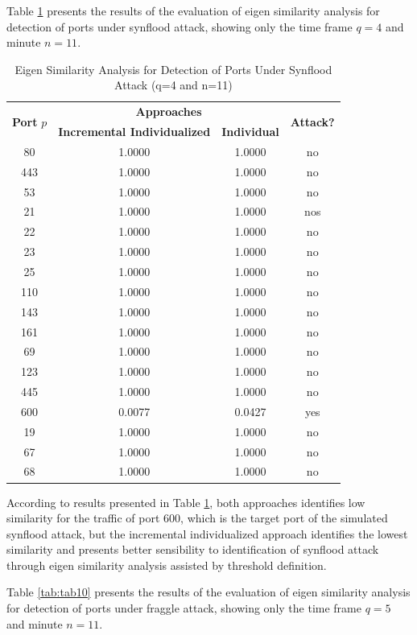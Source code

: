 Table \ref{tab:tab9} presents the results of the evaluation of eigen similarity analysis for detection of ports under synflood attack, showing only the time frame $q=4$ and minute $n=11$.

\begin{table}[h!]
  \centering
  \caption{Eigen Similarity Analysis for Detection of Ports Under Synflood Attack (q=4 and n=11)}
  \label{tab:tab9}
  \begin{tabular}{ c c c c }
	\toprule
	\multirow{2}{*}{\textbf{Port} $p$}   &\multicolumn{2}{c}{\textbf{Approaches}} &\multirow{2}{*}{\textbf{Attack?}}\\ 
			\hhline{~--~}
			&\textbf{Incremental Individualized} &\textbf{Individual}\\
	\midrule
	80 &1.0000 &1.0000 &no \\
	443 &1.0000 &1.0000 &no \\
	53 &1.0000 &1.0000 &no \\
	21 &1.0000 &1.0000 &nos \\
	22 &1.0000 &1.0000 &no \\
	23 &1.0000 &1.0000 &no \\
	25 &1.0000 &1.0000 &no \\
	110 &1.0000 &1.0000 &no \\
	143 &1.0000 &1.0000 &no \\
	161 &1.0000 &1.0000 &no \\
	69 &1.0000 &1.0000 &no \\
	123 &1.0000 &1.0000 &no \\
	445 &1.0000 &1.0000 &no \\
	600 &0.0077 &0.0427 &yes \\
	19 &1.0000 &1.0000 &no \\
	67 &1.0000 &1.0000 &no \\
	68 &1.0000 &1.0000 &no \\
    \bottomrule
  \end{tabular}
\end{table}

According to results presented in Table \ref{tab:tab9}, both approaches identifies low similarity for the traffic of port 600, which is the target port of the simulated synflood attack, but the incremental individualized approach identifies the lowest similarity and presents better sensibility to identification of synflood attack through eigen similarity analysis assisted by threshold definition.

Table \ref{tab:tab10} presents the results of the evaluation of eigen similarity analysis for detection of ports under fraggle attack, showing only the time frame $q=5$ and minute $n=11$.

